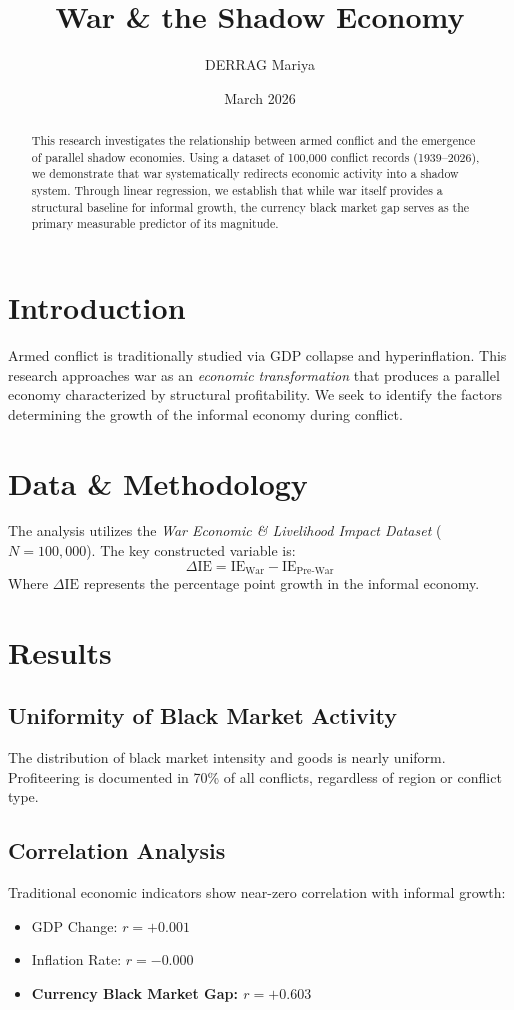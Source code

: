 \documentclass[11pt, a4paper]{article}
\title{\textbf{War \& the Shadow Economy}}
\author{DERRAG Mariya}
\date{March 2026}
\begin{document}
\maketitle

\begin{abstract}
This research investigates the relationship between armed conflict and the emergence of parallel shadow economies. Using a dataset of 100,000 conflict records (1939--2026), we demonstrate that war systematically redirects economic activity into a shadow system. Through linear regression, we establish that while war itself provides a structural baseline for informal growth, the currency black market gap serves as the primary measurable predictor of its magnitude.
\end{abstract}

\section{Introduction}
Armed conflict is traditionally studied via GDP collapse and hyperinflation. This research approaches war as an \textit{economic transformation} that produces a parallel economy characterized by structural profitability. We seek to identify the factors determining the growth of the informal economy during conflict.

\section{Data \& Methodology}
The analysis utilizes the \textit{War Economic \& Livelihood Impact Dataset} ($N = 100,000$). The key constructed variable is:
\begin{equation}
    \Delta \text{IE} = \text{IE}_{\text{War}} - \text{IE}_{\text{Pre-War}}
\end{equation}
Where $\Delta \text{IE}$ represents the percentage point growth in the informal economy.

\section{Results}
\subsection{Uniformity of Black Market Activity}
The distribution of black market intensity and goods is nearly uniform. Profiteering is documented in 70\% of all conflicts, regardless of region or conflict type.

\subsection{Correlation Analysis}
Traditional economic indicators show near-zero correlation with informal growth:
\begin{itemize}
    \item GDP Change: $r = +0.001$
    \item Inflation Rate: $r = -0.000$
    \item \textbf{Currency Black Market Gap: $r = +0.603$}
\end{itemize}
\end{document}
